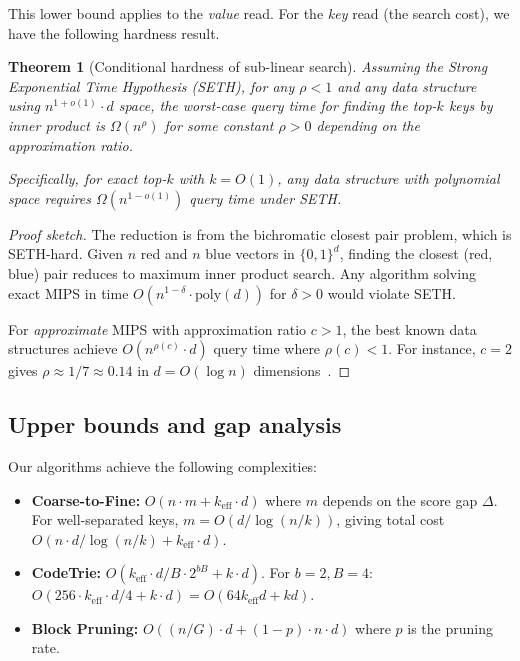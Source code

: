 \documentclass[10pt,twocolumn]{article}
\newtheorem{theorem}{Theorem}[section]
\theoremstyle{definition}
\begin{document}
This lower bound applies to the \emph{value} read.  For the \emph{key} read
(the search cost), we have the following hardness result.

\begin{theorem}[Conditional hardness of sub-linear search]
  \label{thm:hardness}
  Assuming the Strong Exponential Time Hypothesis (SETH), for any $\rho < 1$
  and any data structure using $n^{1+o(1)} \cdot d$ space, the worst-case query
  time for finding the top-$k$ keys by inner product is $\Omega(n^{\rho})$ for
  some constant $\rho > 0$ depending on the approximation ratio.

  Specifically, for exact top-$k$ with $k = O(1)$, any data structure with
  polynomial space requires $\Omega(n^{1-o(1)})$ query time under SETH.
\end{theorem}

\begin{proof}[Proof sketch]
  The reduction is from the bichromatic closest pair problem, which is SETH-hard.
  Given $n$ red and $n$ blue vectors in $\{0,1\}^d$, finding the closest
  (red, blue) pair reduces to maximum inner product search.  Any algorithm
  solving exact MIPS in time $O(n^{1-\delta} \cdot \mathrm{poly}(d))$ for
  $\delta > 0$ would violate SETH.

  For \emph{approximate} MIPS with approximation ratio $c > 1$, the best known
  data structures achieve $O(n^{\rho(c)} \cdot d)$ query time where
  $\rho(c) < 1$.  For instance, $c = 2$ gives $\rho \approx 1/7 \approx 0.14$
  in $d = O(\log n)$ dimensions~\cite{andoni2015optimal}.
\end{proof}

\subsection{Upper bounds and gap analysis}

Our algorithms achieve the following complexities:
\begin{itemize}[nosep]
  \item \textbf{Coarse-to-Fine:} $O(n \cdot m + k_{\text{eff}} \cdot d)$ where
        $m$ depends on the score gap $\Delta$.  For well-separated keys, $m =
        O(d / \log(n/k))$, giving total cost $O(n \cdot d / \log(n/k) +
        k_{\text{eff}} \cdot d)$.
  \item \textbf{CodeTrie:} $O(k_{\text{eff}} \cdot d/B \cdot 2^{bB} + k \cdot
        d)$.  For $b = 2, B = 4$: $O(256 \cdot k_{\text{eff}} \cdot d/4 +
        k \cdot d) = O(64 k_{\text{eff}} d + kd)$.
  \item \textbf{Block Pruning:} $O((n/G) \cdot d + (1-p) \cdot n \cdot d)$
        where $p$ is the pruning rate.
\end{itemize}
\end{document}
